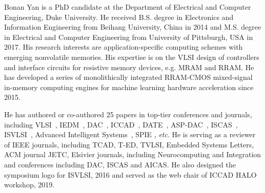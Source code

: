\biography

Bonan Yan is a PhD candidate at the Department of Electrical and Computer Engineering, Duke University. 
He received B.S. degree in Electronics and Information Engineering from Beihang University, China in 2014 and M.S. degree in Electrical and Computer Engineering from University of Pittsburgh, USA in 2017. 
His research interests are application-specific computing schemes with emerging nonvolatile memories. 
His expertise is on the VLSI design of controllers and interface circuits for resistive memory devices, e.g. MRAM and RRAM.
He has developed a series of monolithically integrated RRAM-CMOS mixed-signal in-memory computing engines for machine learning hardware acceleration since 2015.  

He has authored or co-authored 25 papers in top-tier conferences and journals,
including VLSI~\cite{yan2019rram}, IEDM~\cite{yan2017understanding,yan2019designing}, DAC~\cite{liu2015spiking,yan2018neuromorphic}, ICCAD~\cite{yan2017closed}, DATE~\cite{yan2018exploring}, ASP-DAC~\cite{yin2017low}, ISCAS~\cite{yan2016neuromorphic}, ISVLSI~\cite{liu2016memristor}, Advanced Intelligent Systems~\cite{yan2019resistive}, SPIE \cite{taylor2020highly}, \textit{etc}. 
He is serving as a reviewer of IEEE journals, including TCAD, T-ED, TVLSI, Embedded Systems Letters, ACM journal JETC, Elsivier journals, including Neurocomputing and Integration and conferences including DAC, ISCAS and AICAS.  He also designed the symposium logo for ISVLSI, 2016 and served as the web chair of ICCAD HALO workshop, 2019.



